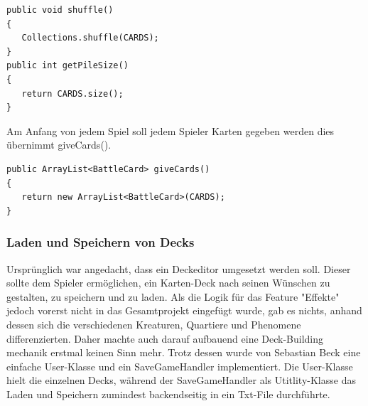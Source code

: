 \begin{lstlisting}
public void shuffle()
{
   Collections.shuffle(CARDS);
}
public int getPileSize()
{
   return CARDS.size();
}
\end{lstlisting}

Am Anfang von jedem Spiel soll jedem Spieler Karten gegeben werden dies übernimmt giveCards().

\begin{lstlisting}
public ArrayList<BattleCard> giveCards()
{
   return new ArrayList<BattleCard>(CARDS);
}
\end{lstlisting}

\subsubsection{Laden und Speichern von Decks}
Ursprünglich war angedacht, dass ein Deckeditor umgesetzt werden soll. Dieser sollte dem Spieler ermöglichen, ein Karten-Deck nach seinen Wünschen zu gestalten, zu speichern und zu laden.  Als die Logik für das Feature "Effekte" jedoch vorerst nicht in das Gesamtprojekt eingefügt wurde, gab es nichts, anhand dessen sich die verschiedenen Kreaturen, Quartiere und Phenomene differenzierten. Daher machte auch darauf aufbauend eine Deck-Building mechanik erstmal keinen Sinn mehr. Trotz dessen wurde von Sebastian Beck eine einfache User-Klasse und ein SaveGameHandler implementiert. Die User-Klasse hielt die einzelnen Decks, während der SaveGameHandler als Utitlity-Klasse das Laden und Speichern zumindest backendseitig in ein Txt-File durchführte.
